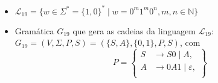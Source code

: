 \documentclass[12pt]{article}
\def\discente{João Lucas Rodrigues Soares}
\def\matricula{202003580}
\def\myling{{19}} %
\newcommand{\ve}{\ensuremath{\varepsilon}}
\begin{document}
%
\begin{tcolorbox}[rounded corners, colback=yellow!5, colframe=red!40!black, title={\discente\ (\matricula)}]
\begin{itemize}
  \item  $\mathcal{L}_{\myling} = \{w \in \Sigma^* = \{1,0\}^* \mid w = 0^m1^m0^n,  m, n \in \mathbb{N}\}$
  \item Gramática $G_{\myling}$ que gera as cadeias da linguagem $\mathcal{L}_{\myling}$:\\
  $G_{\myling}=(V,\Sigma,P,S)=(\{S,A\},\{0,1\}, P, S)$, com
    \[P=\left\{
     \begin{aligned}
      S & \to S0\mid A, \\
      A & \to 0A1\mid \ve, \\
     \end{aligned}
    \right\}\]
 \end{itemize}
\end{tcolorbox}\bigskip
\end{document}
